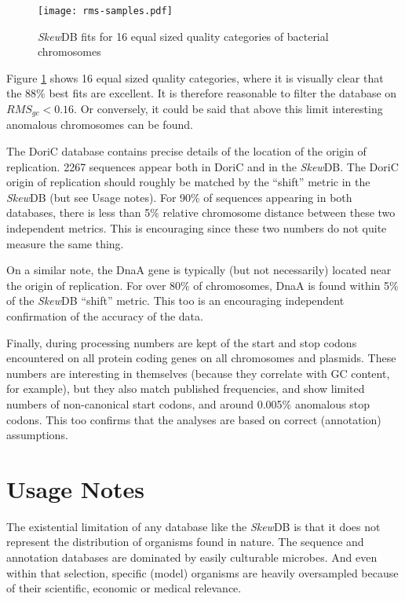 \documentclass[fleqn,10pt]{wlscirep}
\begin{document}
\begin{figure}[tbhp]
\centering
\texttt{[image: rms-samples.pdf]}
\caption{\emph{Skew}DB fits for 16 equal sized quality categories of bacterial chromosomes}
\label{fig:rms-samples}
\end{figure}

Figure \ref{fig:rms-samples} shows 16 equal sized quality categories, where it is visually clear that the 88\% best fits are excellent. It is therefore reasonable to filter the database on $RMS_{gc}<0.16$. Or conversely, it could be said that above this limit interesting anomalous chromosomes can be found. 

The DoriC database \cite{luo_doric_2019} contains precise details of the location of the origin of replication. 2267 sequences appear both in DoriC and in the \emph{Skew}DB. The DoriC origin of replication should roughly be matched by the ``shift'' metric in the \emph{Skew}DB (but see Usage notes). For 90\% of sequences appearing in both databases, there is less than 5\% relative chromosome distance between these two independent metrics. This is encouraging since these two numbers do not quite measure the same thing.

On a similar note, the DnaA gene is typically (but not necessarily) located near the origin of replication. For over 80\% of chromosomes, DnaA is found within 5\% of the \emph{Skew}DB ``shift'' metric. This too is an encouraging independent confirmation of the accuracy of the data.

Finally, during processing numbers are kept of the start and stop codons encountered on all protein coding genes on all chromosomes and plasmids. These numbers are interesting in themselves (because they correlate with GC content, for example), but they also match published frequencies, and show limited numbers of non-canonical start codons, and around 0.005\% anomalous stop codons. This too confirms that the analyses are based on correct (annotation) assumptions.


\section*{Usage Notes}
The existential limitation of any database like the \emph{Skew}DB is that it does not represent the distribution of organisms found in nature. The sequence and annotation databases are dominated by easily culturable microbes. And even within that selection, specific (model) organisms are heavily oversampled because of their scientific, economic or medical relevance.
\end{document}
